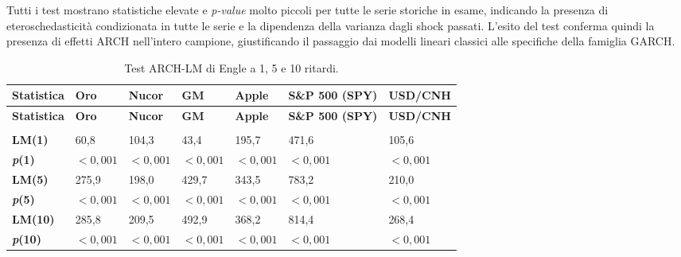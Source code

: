 Tutti i test mostrano statistiche elevate e \emph{p-value} molto piccoli per tutte le serie storiche in esame, indicando la presenza di eteroschedasticità condizionata 
in tutte le serie e la dipendenza della varianza dagli shock passati. L'esito del test conferma quindi la presenza di effetti ARCH nell'intero campione, giustificando 
il passaggio dai modelli lineari classici alle specifiche della famiglia GARCH. 

{
\small
\begin{longtable}{ p{} p{} p{} p{} p{} p{} p{} }
\toprule
\textbf{Statistica} & \textbf{Oro} & \textbf{Nucor} & \textbf{GM} & \textbf{Apple} & \textbf{S\&P 500 (SPY)} & \textbf{USD/\newline CNH} \\
\midrule
\endfirsthead

\toprule
\textbf{Statistica} & \textbf{Oro} & \textbf{Nucor} & \textbf{GM} & \textbf{Apple} & \textbf{S\&P 500 (SPY)} & \textbf{USD/\newline CNH} \\
\midrule
\endhead

\midrule
\noalign{\vspace{10pt}}
\caption[]{Test ARCH-LM di Engle.} \\
\endfoot

\bottomrule
\noalign{\vspace{10pt}}
\caption{Test ARCH-LM di Engle a 1, 5 e 10 ritardi.}
\label{tab:arch-lm}
\endlastfoot

\textbf{LM(1)} & 60,8 & 104,3 & 43,4 & 195,7 & 471,6 & 105,6 \\ \midrule
\textbf{\emph{p}(1)} & $< 0,001$ & $< 0,001$ & $< 0,001$ & $< 0,001$ & $< 0,001$ & $< 0,001$ \\ \midrule
\textbf{LM(5)} & 275,9 & 198,0 & 429,7 & 343,5 & 783,2 & 210,0 \\ \midrule
\textbf{\emph{p}(5)} & $< 0,001$ & $< 0,001$ & $< 0,001$ & $< 0,001$ & $< 0,001$ & $< 0,001$ \\ \midrule
\textbf{LM(10)} & 285,8 & 209,5 & 492,9 & 368,2 & 814,4 & 268,4 \\ \midrule
\textbf{\emph{p}(10)} & $< 0,001$ & $< 0,001$ & $< 0,001$ & $< 0,001$ & $< 0,001$ & $< 0,001$ \\
\end{longtable}
}